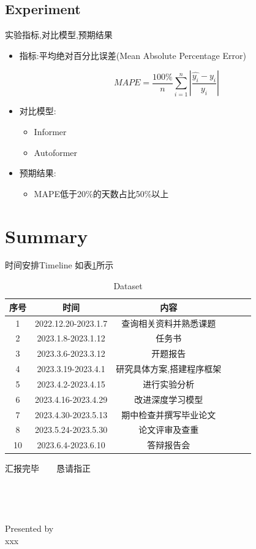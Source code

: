 \documentclass{ctexbeamer}
\begin{document}
\subsection{Experiment}
\begin{frame}{实验}{指标,对比模型,预期结果}
\begin{itemize}
    \item {指标:平均绝对百分比误差(Mean Absolute Percentage Error)}
    \begin{center}
        \begin{equation*}
            MAPE = \frac{100\%}{n} \sum_{i=1}^{n}|\frac{\hat{y_i}-y_i}{y_i}|
        \end{equation*}
    \end{center}  
    \item {对比模型:}
    \begin{itemize}
        \item {Informer}
        \item {Autoformer}
    \end{itemize}
    \item {预期结果:}
    \begin{itemize}
        \item {MAPE低于20\%的天数占比50\%以上}
    \end{itemize}
\end{itemize}
\end{frame}

\section{Summary}
\begin{frame}{时间安排}{Timeline}
    如表\ref{tab2}所示
    \begin{table}
    \centering
    \caption{Dataset}
    \label{tab2}
    \begin{tabular}{cccccc}
    \toprule
    序号 & 时间 & 内容  \\
    \midrule
    1 & 2022.12.20-2023.1.7 & 查询相关资料并熟悉课题  \\
    2 & 2023.1.8-2023.1.12 & 任务书  \\
    3 & 2023.3.6-2023.3.12 & 开题报告  \\
    4 & 2023.3.19-2023.4.1 & 研究具体方案,搭建程序框架  \\
    5 & 2023.4.2-2023.4.15 & 进行实验分析  \\
    6 & 2023.4.16-2023.4.29 & 改进深度学习模型  \\
    7 & 2023.4.30-2023.5.13 & 期中检查并撰写毕业论文  \\
    8 & 2023.5.24-2023.5.30 & 论文评审及查重  \\
    10 & 2023.6.4-2023.6.10 & 答辩报告会  \\
    \bottomrule
    \end{tabular}
    \end{table}
\end{frame}




\begin{frame}
    \begin{center}
        汇报完毕~~~~恳请指正
        ~\\
        ~\\
        ~\\
        ~\\
        ~\\
        Presented by
        ~\\
        xxx
    \end{center}
\end{frame}
\end{document}
